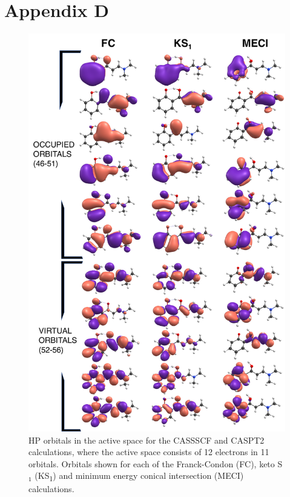 \documentclass[a4paper,11.5pt]{report}
\def\sone{S$_{1}$}
\begin{document}
\section*{Appendix D}
\label{appendix2}
\begin{figure}[H]
\centering
  \includegraphics[width=0.9\linewidth]{Misc/CAS_ORBITALS.pdf}
  \caption[CASSCF and CASPT2 space used in Chapter \ref{chapter: Connecting}.]{HP orbitals in the active space for the CASSSCF and CASPT2 calculations, where the active space consists of 12 electrons in 11 orbitals. Orbitals shown for each of the Franck-Condon (FC), keto \sone{} (KS\textsubscript{1}) and minimum energy conical intersection (MECI) calculations.}
  \label{figure: HP_CASSCF_Orbitals}
\end{figure}
\end{document}
